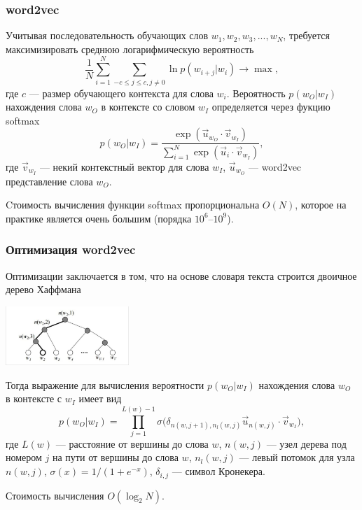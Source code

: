 \documentclass[compress,professionalfont]{beamer}
\begin{document}
\begin{frame}
\frametitle{word2vec}

Учитывая последовательность обучающих слов $w_1, w_2, w_3, ..., w_N$, требуется максимизировать среднюю логарифмическую вероятность
$$
\dfrac{1}{N}\sum_{i=1}^{N}\sum_{-c \leqslant j \leqslant c, j \neq 0} \ln p(w_{i+j}|w_i) \rightarrow \max,
$$
где $c$ --- размер обучающего контекста для слова $w_i$. Вероятность $p(w_O|w_I)$ нахождения слова $w_O$ в контексте со словом $w_I$ определяется через фукцию softmax
$$
p(w_O|w_I) = \dfrac{\exp({\vec{u}_{w_O}\cdot\vec{v}_{w_I}})}{\sum_{i=1}^{N} \exp({\vec{u}_{i} \cdot \vec{v}_{w_I}})},
$$
где $\vec{v}_{w_I}$ --- некий контекстный вектор для слова $w_I$, $\vec{u}_{w_O}$ --- word2vec представление слова $w_O$.

Cтоимость вычисления функции softmax пропорциональна $O(N)$, которое на практике является очень большим (порядка $10^6$--$10^9$).


\end{frame}

\begin{frame}
\frametitle{Оптимизация word2vec}

Оптимизации заключается в том, что на основе словаря текста строится двоичное дерево Хаффмана
\begin{center}
\includegraphics[width=0.35\textwidth]{huffman.jpg}
\end{center}

Тогда выражение для вычисления вероятности $p(w_O|w_I)$ нахождения слова $w_O$ в контексте с $w_I$ имеет вид
$$
p(w_O|w_I) = \prod\limits_{j=1}^{L(w)-1} \sigma \Big(\delta_{n(w,j+1), n_l(w,j)} \vec{u}_{n(w,j)} \cdot \vec{v}_{w_I} \Big),
$$
где $L(w)$ --- расстояние от вершины до слова $w$, $n(w, j)$ --- узел дерева под номером $j$ на пути от вершины до слова $w$, $n_l(w,j)$ --- левый потомок для узла $n(w,j)$, $\sigma(x) = 1 / (1 + e^{-x})$, $\delta_{i,j}$ --- символ Кронекера.

Стоимость вычисления $O(\log_2 N)$.

\end{frame}
\end{document}

